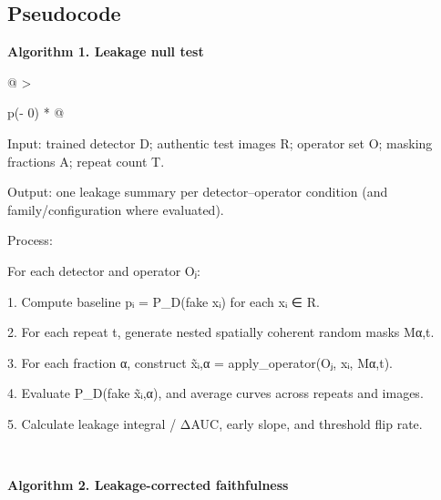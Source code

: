 \subsection{\texorpdfstring{\textbf{Pseudocode}}{Pseudocode}}\label{pseudocode}

\textbf{Algorithm 1. Leakage null test}

\begin{longtable}[]{@{}
  >{\raggedright\arraybackslash}p{(\columnwidth - 0\tabcolsep) * }@{}}
\toprule\noalign{}
\begin{minipage}[b]{\linewidth}\raggedright
Input: trained detector D; authentic test images R; operator set O;
masking fractions A; repeat count T.

Output: one leakage summary per detector--operator condition (and
family/configuration where evaluated).

Process:

For each detector and operator Oⱼ:

1. Compute baseline pᵢ = P\_D(fake \textbar{} xᵢ) for each xᵢ ∈ R.

2. For each repeat t, generate nested spatially coherent random masks
Mα,t.

3. For each fraction α, construct x̃ᵢ,α = apply\_operator(Oⱼ, xᵢ, Mα,t).

4. Evaluate P\_D(fake \textbar{} x̃ᵢ,α), and average curves across
repeats and images.

5. Calculate leakage integral / ΔAUC, early slope, and threshold flip
rate.
\end{minipage} \\
\midrule\noalign{}
\endhead
\bottomrule\noalign{}
\endlastfoot
\end{longtable}
\addtocounter{table}{-1} %

\textbf{Algorithm 2. Leakage-corrected faithfulness}


